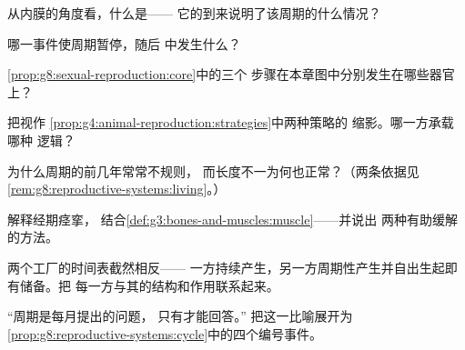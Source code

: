 \begin{exercise}[$\star$]\label{exo:g8:reproductive-systems:5}
从内膜的角度看，什么是——
它的到来说明了该周期的什么情况？
\end{exercise}

\begin{exercise}[$\star$]\label{exo:g8:reproductive-systems:6}
哪一事件使周期暂停，随后
中发生什么？
\end{exercise}

\begin{exercise}[$\star\star$]\label{exo:g8:reproductive-systems:7}
\cref{prop:g8:sexual-reproduction:core}中的三个
步骤在本章图中分别发生在哪些器官上？
\end{exercise}

\begin{exercise}[$\star\star$]\label{exo:g8:reproductive-systems:8}
把视作
\cref{prop:g4:animal-reproduction:strategies}中两种策略的
缩影。哪一方承载哪种
逻辑？
\end{exercise}

\begin{exercise}[$\star\star$]\label{exo:g8:reproductive-systems:9}
为什么周期的前几年常常不规则，
而长度不一为何也正常？（两条依据见
\cref{rem:g8:reproductive-systems:living}。）
\end{exercise}

\begin{exercise}[$\star\star$]\label{exo:g8:reproductive-systems:10}
解释经期痉挛，
结合\cref{def:g3:bones-and-muscles:muscle}——并说出
两种有助缓解的方法。
\end{exercise}

\begin{exercise}[$\star\star$]\label{exo:g8:reproductive-systems:11}
两个工厂的时间表截然相反——
一方持续产生，另一方周期性产生并自出生起即有储备。把
每一方与其的结构和作用联系起来。
\end{exercise}

\begin{exercise}[$\star\star\star$]\label{exo:g8:reproductive-systems:12}
“周期是每月提出的问题，
只有才能回答。”
把这一比喻展开为
\cref{prop:g8:reproductive-systems:cycle}中的四个编号事件。
\end{exercise}

